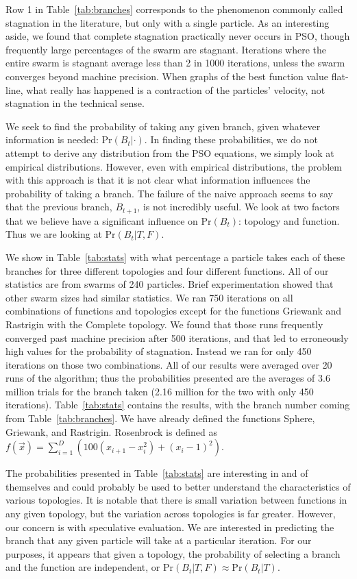 \documentclass[journal,letterpaper]{IEEEtran}
\providecommand{\prob}{\ensuremath{\mathrm{Pr}}}
\begin{document}
Row 1 in Table~\ref{tab:branches} corresponds to the phenomenon commonly called
stagnation in the literature, but only with a single particle.  As an
interesting aside, we found that complete stagnation practically never occurs
in PSO, though frequently large percentages of the swarm are stagnant.
Iterations where the entire swarm is stagnant average less than 2 in 1000
iterations, unless the swarm converges beyond machine precision.  When graphs
of the best function value flat-line, what really has happened is a contraction
of the particles' velocity, not stagnation in the technical sense.  

We seek to find the probability of taking any given branch, given whatever
information is needed: $\prob(B_t|\cdot)$.  In finding these probabilities, we
do not attempt to derive any distribution from the PSO equations, we simply
look at empirical distributions.  However, even with empirical distributions,
the problem with this approach is that it is not clear what information
influences the probability of taking a branch.  The failure of the naive
approach seems to say that the previous branch, $B_{t+1}$, is not incredibly
useful.  We look at two factors that we believe have a significant influence on
$\prob(B_t)$: topology and function.  Thus we are looking at $\prob(B_t|T,F)$.

We show in Table~\ref{tab:stats} with what percentage a particle takes each of
these branches for three different topologies and four different functions.
All of our statistics are from swarms of 240 particles.  Brief experimentation
showed that other swarm sizes had similar statistics.  We ran 750 iterations on
all combinations of functions and topologies except for the functions Griewank
and Rastrigin with the Complete topology.  We found that those runs frequently
converged past machine precision after 500 iterations, and that led to
erroneously high values for the probability of stagnation.  Instead we ran for
only 450 iterations on those two combinations.  All of our results were
averaged over 20 runs of the algorithm; thus the probabilities presented are
the averages of 3.6 million trials for the branch taken (2.16 million for the
two with only 450 iterations).  Table~\ref{tab:stats} contains the results,
with the branch number coming from Table~\ref{tab:branches}.  We have already
defined the functions Sphere, Griewank, and Rastrigin.  Rosenbrock is defined
as $f(\Vec{x}) = \sum_{i=1}^D \left(100(x_{i+1}-x_i^2)+(x_i-1)^2\right)$.

The probabilities presented in Table~\ref{tab:stats} are interesting in and of
themselves and could probably be used to better understand the characteristics
of various topologies.  It is notable that there is small variation between
functions in any given topology, but the variation across topologies is far
greater.  However, our concern is with speculative evaluation.  We are
interested in predicting the branch that any given particle will take at a
particular iteration.  For our purposes, it appears that given a topology, the
probability of selecting a branch and the function are independent, or
$\prob(B_t|T,F) \approx \prob(B_t|T)$.
\end{document}
